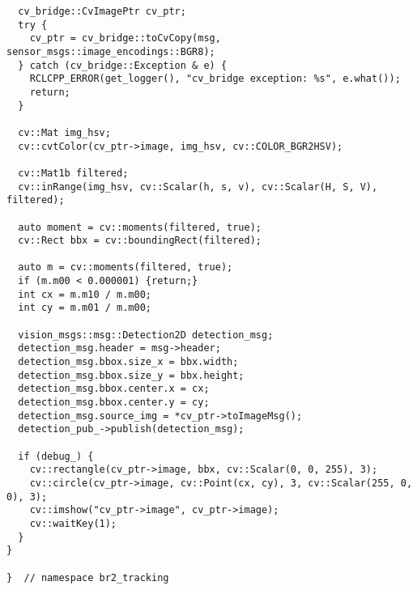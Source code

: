 \begin{tcolorbox}[sharp corners, colframe=gray!80, colback=LightGray, left=0pt, top=0pt, bottom=0pt, title=\texttt{br2\_tracking/src/br2\_tracking/ObjectDetector.cpp}]
\begin{verbatim}
  cv_bridge::CvImagePtr cv_ptr;
  try {
    cv_ptr = cv_bridge::toCvCopy(msg, sensor_msgs::image_encodings::BGR8);
  } catch (cv_bridge::Exception & e) {
    RCLCPP_ERROR(get_logger(), "cv_bridge exception: %s", e.what());
    return;
  }

  cv::Mat img_hsv;
  cv::cvtColor(cv_ptr->image, img_hsv, cv::COLOR_BGR2HSV);

  cv::Mat1b filtered;
  cv::inRange(img_hsv, cv::Scalar(h, s, v), cv::Scalar(H, S, V), filtered);

  auto moment = cv::moments(filtered, true);
  cv::Rect bbx = cv::boundingRect(filtered);

  auto m = cv::moments(filtered, true);
  if (m.m00 < 0.000001) {return;}
  int cx = m.m10 / m.m00;
  int cy = m.m01 / m.m00;

  vision_msgs::msg::Detection2D detection_msg;
  detection_msg.header = msg->header;
  detection_msg.bbox.size_x = bbx.width;
  detection_msg.bbox.size_y = bbx.height;
  detection_msg.bbox.center.x = cx;
  detection_msg.bbox.center.y = cy;
  detection_msg.source_img = *cv_ptr->toImageMsg();
  detection_pub_->publish(detection_msg);

  if (debug_) {
    cv::rectangle(cv_ptr->image, bbx, cv::Scalar(0, 0, 255), 3);
    cv::circle(cv_ptr->image, cv::Point(cx, cy), 3, cv::Scalar(255, 0, 0), 3);
    cv::imshow("cv_ptr->image", cv_ptr->image);
    cv::waitKey(1);
  }
}

}  // namespace br2_tracking
    \end{verbatim}
    \end{tcolorbox}
  \normalsize

